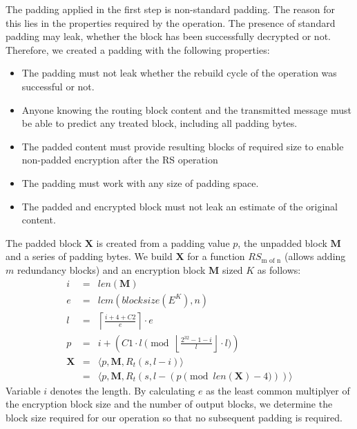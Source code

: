 The padding applied in the first step is non-standard padding. The reason for this lies in the properties required by the operation. The presence of standard padding may leak, whether the block has been successfully decrypted or not. Therefore, we created a padding with the following properties:
\begin{itemize}
	\item The padding must not leak whether the rebuild cycle of the operation was successful or not.
	\item Anyone knowing the routing block content and the transmitted message must be able to predict any treated block, including all padding bytes.
	\item The padded content must provide resulting blocks of required size to enable non-padded encryption after the RS operation
	\item The padding must work with any size of padding space.
	\item The padded and encrypted block must not leak an estimate of the original content.
\end{itemize}

The padded block $\mathbf{X}$ is created from a padding value $p$, the unpadded block $\mathbf{M}$ and a series of padding bytes. We build $\mathbf{X}$ for a function $RS_{\text{m of n}}$ (allows adding $m$ redundancy blocks) and an encryption block $\mathbf{M}$ sized $K$ as follows:
\begin{eqnarray}
	i          & = & len(\mathbf{M}) \label{eqn:sizeOrigMsg}\\
	e          & = & lcm\left(blocksize\left(E^{K}\right), n\right) \label{eqn:sizeOfOpBlock}\\
	l          & = & \left\lceil\frac{i + 4 + C2 }{e}\right\rceil\cdot e \label{eqn:sizeOfPaddedBlock}\\
	p          & = & i + \left( C1 \cdot l \pmod{\left\lfloor\frac{2^{32}-1-i}{l}\right\rfloor\cdot l}\right)\\
	\mathbf{X} & = & \langle p,\mathbf{M},R_{t}\left(s,l-i\right)\rangle\\\nonumber
	& = & \langle p,\mathbf{M},R_{t}\left(s,l-\left(p \pmod{len\left(\mathbf{X}\right)-4}\right)\right)\rangle
\end{eqnarray}    
Variable $i$ denotes the length. By calculating $e$ as the least common multiplyer of the encryption block size and the number of output blocks, we determine the block size required for our operation so that no subsequent padding is required.

